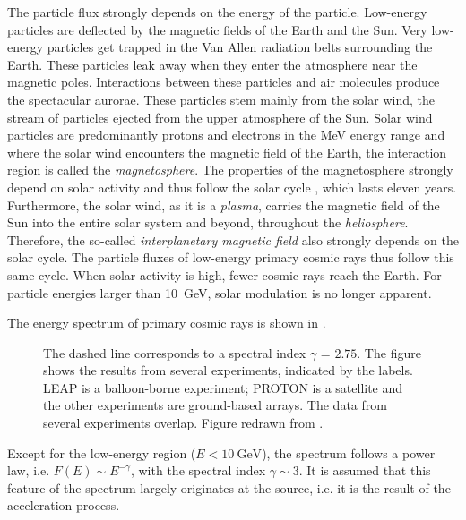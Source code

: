The particle flux strongly depends on the energy of the particle.  Low-energy
particles are deflected by the magnetic fields of the Earth and the Sun. Very
low-energy particles get trapped in the Van Allen radiation belts surrounding
the Earth.  These particles leak away when they enter the atmosphere near the
magnetic poles.  Interactions between these particles and air molecules produce the
spectacular aurorae.  These particles stem mainly from the solar wind, the stream
of particles ejected from the upper atmosphere of the Sun. Solar wind particles
are predominantly protons and electrons in the \si{\mega\electronvolt} energy
range \parencite{Grupen:2005} and where the solar wind encounters the magnetic field of
the Earth,
the interaction region is called the \emph{magnetosphere}. The properties of the
magnetosphere strongly depend on solar activity and thus follow the solar cycle
\parencite{Nagashima:1989}, which lasts eleven years.
Furthermore, the solar wind, as it is a \emph{plasma}, carries the magnetic
field of the Sun into the entire solar system and beyond, throughout the
\emph{heliosphere}.  Therefore, the so-called \emph{interplanetary magnetic
field} also strongly depends on the solar cycle.
The particle fluxes of low-energy primary cosmic rays thus follow this same
cycle.  When solar activity is high, fewer cosmic rays reach the Earth.  For
particle energies larger than \SI{10}{\giga\electronvolt}, solar modulation is
no longer apparent.

The energy spectrum of primary cosmic rays is shown in
.
\begin{figure}
\centering
{

}
\caption{  The dashed line corresponds to a spectral index
$\gamma$ = $2.75$.  The figure shows the results from several
experiments, indicated by the labels.  LEAP is a balloon-borne
experiment; PROTON is a satellite and the other experiments are
ground-based arrays.  The data from several experiments overlap.  Figure
redrawn from \textcite{Cronin:1997}.}
\label{fig:energy_spectrum}
\end{figure}
Except for the low-energy region ($E < \SI{10}{\giga\electronvolt}$), the
spectrum follows a power law, i.e. $F(E) \sim E^{-\gamma}$, with the
spectral index $\gamma \sim 3$.  It is assumed that this feature of the spectrum
largely originates at the source, i.e. it is the result of the acceleration process.

